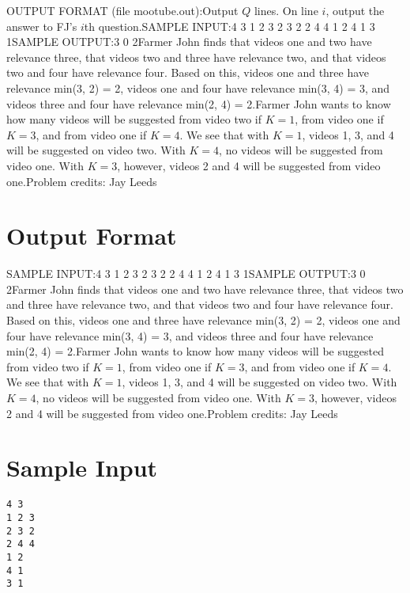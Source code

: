 \documentclass[12pt]{article}
\begin{document}
OUTPUT FORMAT (file mootube.out):Output $Q$ lines.  On line $i$, output the answer to FJ's $i$th question.SAMPLE INPUT:4 3
1 2 3
2 3 2
2 4 4
1 2
4 1
3 1SAMPLE OUTPUT:3
0
2Farmer John finds that videos one and two have relevance three, that videos two
and three have relevance two, and that videos two and four have relevance four. 
Based on this, videos one and three have relevance min(3, 2) = 2, videos one and
four have relevance min(3, 4) = 3, and videos three and four have relevance
min(2, 4) = 2.Farmer John wants to know how many videos will be suggested from video two if
$K=1$, from video one if $K=3$, and from video one if $K=4$.  We see that with
$K=1$, videos 1, 3, and 4 will be suggested on video two.  With $K=4$, no videos
will be suggested from video one.  With $K=3$, however, videos 2 and 4 will be
suggested from video one.Problem credits: Jay Leeds

\section*{Output Format}
SAMPLE INPUT:4 3
1 2 3
2 3 2
2 4 4
1 2
4 1
3 1SAMPLE OUTPUT:3
0
2Farmer John finds that videos one and two have relevance three, that videos two
and three have relevance two, and that videos two and four have relevance four. 
Based on this, videos one and three have relevance min(3, 2) = 2, videos one and
four have relevance min(3, 4) = 3, and videos three and four have relevance
min(2, 4) = 2.Farmer John wants to know how many videos will be suggested from video two if
$K=1$, from video one if $K=3$, and from video one if $K=4$.  We see that with
$K=1$, videos 1, 3, and 4 will be suggested on video two.  With $K=4$, no videos
will be suggested from video one.  With $K=3$, however, videos 2 and 4 will be
suggested from video one.Problem credits: Jay Leeds

\section*{Sample Input}
\begin{verbatim}
4 3
1 2 3
2 3 2
2 4 4
1 2
4 1
3 1
\end{verbatim}
\end{document}
